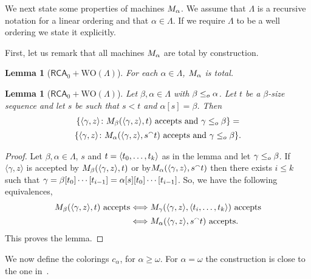 \documentclass[11pt]{amsart}
\newtheorem{lemma}[thm]{Lemma}
\theoremstyle{definition}
\theoremstyle{remark}
\theoremstyle{plain}
\def\conc{{}^\smallfrown}
\newcommand{\RCA}{\mathsf{RCA}_0}
\newcommand{\set}[1]{{\{{#1}\}}}
\def\WO{{\textrm{WO}}}
\newcommand{\leqo}{\leq\sb{o}}
\def\ifff{\Longleftrightarrow}
\begin{document}
We next state some properties of machines $M\sb\alpha$. We assume that $\Lambda$ is a recursive notation for a linear ordering and that $\alpha\in\Lambda$. 
If we require $\Lambda$ to be a well ordering we state it explicitly.

First, let us remark that all machines $M\sb\alpha$ are total by construction.

\begin{lemma}[$\RCA+\WO(\Lambda)$]
For each $\alpha\in\Lambda$, $M\sb\alpha$ is total.
\end{lemma}

\begin{lemma}[$\RCA+\WO(\Lambda)$]\label{lem:from:alpha:to:beta}
Let $\beta, \alpha\in\Lambda$ with $\beta\leqo \alpha$.
Let $t$ be a $\beta$-size sequence and let $s$ be such that $s < t$ and $\alpha[s]=\beta$.
Then 
\begin{multline*}
\set{\langle\gamma,z\rangle\colon M\sb\beta(\langle\gamma,z\rangle,t)\mbox{ accepts and }\gamma\leqo \beta } =\\
\set{\langle\gamma,z\rangle\colon M\sb\alpha(\langle\gamma,z\rangle, s \conc t)\mbox{ accepts and }\gamma\leqo \beta }.
\end{multline*}
\end{lemma}

\begin{proof}
Let $\beta,\alpha\in\Lambda$, $s$ and $t=\langle t\sb0,\dots,t\sb k\rangle$ as in the lemma and let $\gamma\leqo\beta$.
If $\langle\gamma,z\rangle$ is accepted by $M\sb\beta(\langle\gamma,z\rangle,t)$ or by$M\sb\alpha(\langle\gamma,z\rangle,s \conc t)$ then there exists $i\leq k$ such that $\gamma=\beta[t\sb 0]\cdots [t\sb {i-1}]= \alpha[s][t\sb 0]\cdots [t\sb{i-1}]$.
So, we have the following equivalences, 
\begin{align*}
M\sb\beta(\langle\gamma,z\rangle,t)\mbox{ accepts} & \ifff M\sb\gamma(\langle\gamma,z\rangle,\langle t\sb i,\dots, t\sb k\rangle)\mbox{ accepts}\\
&\ifff M\sb\alpha(\langle\gamma,z\rangle,s \conc t)\mbox{ accepts}.
\end{align*}
This proves the lemma.
\end{proof}

We now define the colorings $c_\alpha$, for $\alpha \geq \omega$. For $\alpha = \omega$ the construction is close to the one in~\cite{carlucci2014}.
\end{document}
